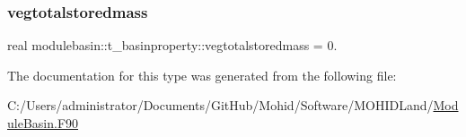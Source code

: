 \mbox{\label{structmodulebasin_1_1t__basinproperty_a75dae9c805abb82e2512b65b7701a3a5}} 
\subsubsection{\texorpdfstring{vegtotalstoredmass}{vegtotalstoredmass}}
{\footnotesize\ttfamily real modulebasin\+::t\+\_\+basinproperty\+::vegtotalstoredmass = 0.\hspace{0.3cm}{\ttfamily [private]}}



The documentation for this type was generated from the following file\+:\begin{DoxyCompactItemize}
\item 
C\+:/\+Users/administrator/\+Documents/\+Git\+Hub/\+Mohid/\+Software/\+M\+O\+H\+I\+D\+Land/\mbox{\hyperlink{_module_basin_8_f90}{Module\+Basin.\+F90}}\end{DoxyCompactItemize}

